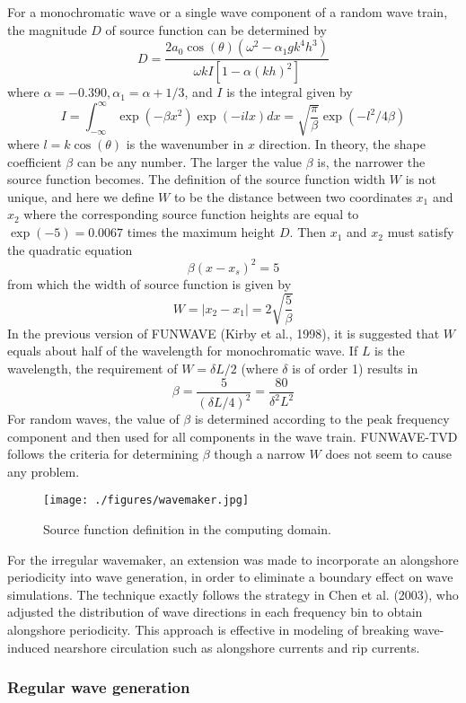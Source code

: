 \documentclass[11pt]{article}
\newcommand{\be}{\begin{equation}}
\newcommand{\ee}{\end{equation}}
\begin{document}
For a monochromatic wave or a single wave component of a random wave train, the magnitude $D$ of source function can be determined by
\be
D = \frac{2 a_0 \cos (\theta) (\omega^2 - \alpha_1 g k^4 h^3) }{\omega k I [1-\alpha(kh)^2]}
\label{Dmag}
\ee
where $\alpha = -0.390, \alpha_1 = \alpha + 1/3$, and $I$ is the integral given by
\be
I = \int^\infty_{-\infty} \exp (-\beta x^2) \exp (-ilx) dx = \sqrt{\frac{\pi}{\beta}} \exp(- l^2/4\beta)
\ee
where $l=k\cos (\theta)$ is the wavenumber in $x$ direction. In theory, the shape coefficient $\beta$ can be any number. The larger the value $\beta$ is, the narrower the source function becomes. The definition of the source function width $W$ is not unique, and here we define $W$ to be the distance between two coordinates $x_1$ and $x_2$ where the corresponding source function heights are equal to $\exp (-5) = 0.0067$ times the maximum height $D$. Then $x_1$ and $x_2$ must satisfy the quadratic equation
\be
\beta (x-x_s)^2 = 5
\ee
from which the width of source function is given by
\be
W = |x_2 - x_1| = 2\sqrt{\frac{5}{\beta}}
\ee
In the previous version of FUNWAVE (Kirby et al., 1998), it is suggested that $W$ equals about half of the wavelength for monochromatic wave. 
If $L$ is the wavelength, the requirement of $W=\delta L/2$ (where $\delta$ is of order 1) results in
\be
\beta = \frac{5}{(\delta L/4)^2} = \frac{80}{\delta^2 L^2}
\ee
For random waves, the value of $\beta$ is determined according to the peak frequency component and then used for all components in the wave train. FUNWAVE-TVD follows the criteria for determining $\beta$ though a narrow $W$ does not seem to cause any problem. 

\begin{figure}[htbp]
\centering
\texttt{[image: ./figures/wavemaker.jpg]}
\caption{Source function definition in the computing domain.}
\label{wavemaker}
\end{figure}

For the irregular wavemaker, an extension was made to incorporate an  alongshore periodicity into wave generation,  in order to eliminate a boundary effect on wave simulations. The technique exactly follows the strategy in Chen et al. (2003), who adjusted the distribution of wave directions in each frequency bin to obtain alongshore periodicity. This approach is effective in modeling of  breaking wave-induced nearshore circulation such as alongshore currents and rip currents. 

\subsubsection{Regular wave generation}
\end{document}
